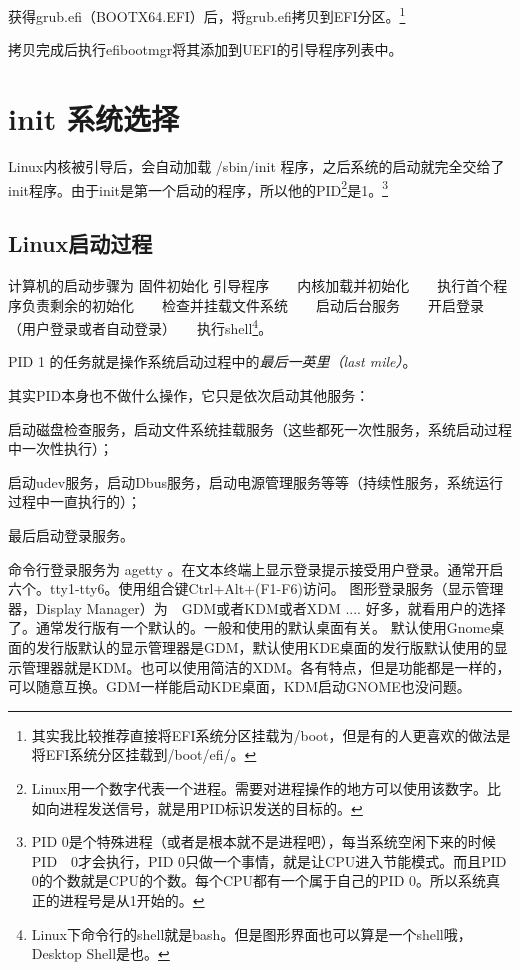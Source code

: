获得grub.efi（BOOTX64.EFI）后，将grub.efi拷贝到EFI分区。\footnote{其实我比较推荐直接将EFI系统分区挂载为/boot，但是有的人更喜欢的做法是将EFI系统分区挂载到/boot/efi/。}

拷贝完成后执行efibootmgr将其添加到UEFI的引导程序列表中。

\section{init 系统选择}

Linux内核被引导后，会自动加载 /sbin/init 程序，之后系统的启动就完全交给了init程序。由于init是第一个启动的程序，所以他的PID\footnote{Linux用一个数字代表一个进程。需要对进程操作的地方可以使用该数字。比如向进程发送信号，就是用PID标识发送的目标的。}是1。\footnote{PID 0是个特殊进程（或者是根本就不是进程吧），每当系统空闲下来的时候PID　0才会执行，PID 0只做一个事情，就是让CPU进入节能模式。而且PID　0的个数就是CPU的个数。每个CPU都有一个属于自己的PID 0。所以系统真正的进程号是从1开始的。}

\begin{insertnote}
\subsection*{Linux启动过程}
计算机的启动步骤为 固件初始化 \textrightarrow{} 引导程序　\textrightarrow{}　内核加载并初始化　\textrightarrow{}　执行首个程序负责剩余的初始化　\textrightarrow{}　检查并挂载文件系统　\textrightarrow{}　启动后台服务　\textrightarrow{}　开启登录　\textrightarrow{}　（用户登录或者自动登录）　\textrightarrow{}　执行shell\footnote{Linux下命令行的shell就是bash。但是图形界面也可以算是一个shell哦，Desktop Shell是也。}。

PID 1 的任务就是操作系统启动过程中的{\em 最后一英里（last mile）}。

其实PID本身也不做什么操作，它只是依次启动其他服务：

启动磁盘检查服务，启动文件系统挂载服务（这些都死一次性服务，系统启动过程中一次性执行）；

启动udev服务，启动Dbus服务，启动电源管理服务等等（持续性服务，系统运行过程中一直执行的）；

最后启动登录服务。

命令行登录服务为 agetty 。在文本终端上显示登录提示接受用户登录。通常开启六个。tty1-tty6。使用组合键Ctrl+Alt+(F1-F6)访问。
图形登录服务（显示管理器，Display Manager）为　GDM或者KDM或者XDM .... 好多，就看用户的选择了。通常发行版有一个默认的。一般和使用的默认桌面有关。
默认使用Gnome桌面的发行版默认的显示管理器是GDM，默认使用KDE桌面的发行版默认使用的显示管理器就是KDM。也可以使用简洁的XDM。各有特点，但是功能都是一样的，可以随意互换。GDM一样能启动KDE桌面，KDM启动GNOME也没问题。

\end{insertnote}

